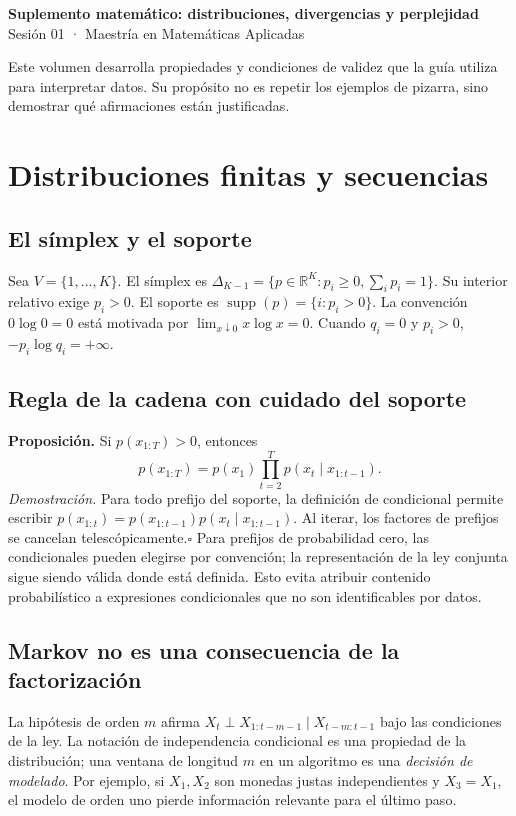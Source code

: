 \documentclass[11pt,a4paper]{report}
\begin{document}
\begin{center}{\LARGE\bfseries Suplemento matemático: distribuciones, divergencias y perplejidad}\\[5pt]
{\large Sesión 01 · Maestría en Matemáticas Aplicadas}\end{center}
\noindent Este volumen desarrolla propiedades y condiciones de validez que la guía
utiliza para interpretar datos. Su propósito no es repetir los ejemplos de pizarra,
sino demostrar qué afirmaciones están justificadas.
\tableofcontents\clearpage
\chapter{Distribuciones finitas y secuencias}
\section{El símplex y el soporte}
Sea $V=\{1,\ldots,K\}$. El símplex es
$\Delta_{K-1}=\{p\in\mathbb R^K:p_i\ge0,\sum_i p_i=1\}$.
Su interior relativo exige $p_i>0$. El soporte es
$\operatorname{supp}(p)=\{i:p_i>0\}$. La convención
$0\log0=0$ está motivada por $\lim_{x\downarrow0}x\log x=0$.
Cuando $q_i=0$ y $p_i>0$, $-p_i\log q_i=+\infty$.
\section{Regla de la cadena con cuidado del soporte}
\textbf{Proposición.} Si $p(x_{1:T})>0$, entonces
\[p(x_{1:T})=p(x_1)\prod_{t=2}^T p(x_t\mid x_{1:t-1}).\]
\textit{Demostración.} Para todo prefijo del soporte, la definición de
condicional permite escribir
$p(x_{1:t})=p(x_{1:t-1})p(x_t\mid x_{1:t-1})$.
Al iterar, los factores de prefijos se cancelan telescópicamente.\hfill$\square$
Para prefijos de probabilidad cero, las condicionales pueden elegirse por
convención; la representación de la ley conjunta sigue siendo válida donde
está definida. Esto evita atribuir contenido probabilístico a expresiones
condicionales que no son identificables por datos.
\section{Markov no es una consecuencia de la factorización}
La hipótesis de orden $m$ afirma
$X_t\perp X_{1:t-m-1}\mid X_{t-m:t-1}$ bajo las condiciones de la ley.
La notación de independencia condicional es una propiedad de la distribución;
una ventana de longitud $m$ en un algoritmo es una \emph{decisión de modelado}.
Por ejemplo, si $X_1,X_2$ son monedas justas independientes y $X_3=X_1$,
el modelo de orden uno pierde información relevante para el último paso.
\end{document}
